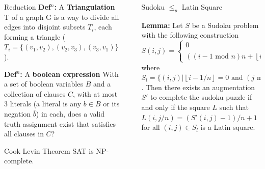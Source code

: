 \documentclass[final]{beamer}
\newlength{\sepwidth}
\newlength{\colwidth}
\newcounter{row}
\newcounter{col}
\newcommand{\separatorcolumn}{\begin{column}{\sepwidth}\end{column}}
\newcommand\setrow[9]{
  \setcounter{col}{1}
  \foreach \n in {#1, #2, #3, #4, #5, #6, #7, #8, #9} {
    \edef\x{\value{col} - 0.5}
    \edef\y{9.5 - \value{row}}
    \node[anchor=center] at (\x, \y) {\n};
    \stepcounter{col}
  }
  \stepcounter{row}
}
\begin{document}
\begin{frame}[t]
\begin{columns}[t]
\begin{column}{\colwidth}
\begin{block}{Reduction}
\textbf{Def$^n$:} A \textbf{Triangulation} T of a graph G is a way to divide all edges into disjoint subsets $T_i$, each forming a triangle ($T_i=\{(v_{1}, v_{2}),(v_{2}, v_{3}),(v_{3},v_{1})\}$).

\textbf{Def$^n$:} A \textbf{boolean expression}  With a set of boolean variables $B$ and a collection of clauses $C$, with at most 3 literals (a literal is any $b \in B$ or its negation $\bar{b}$) in each, does a valid truth assignment exist that satisfies all clauses in $C$?


  \end{block}
  \begin{alertblock}{Cook Levin Theorem}
SAT is NP-complete.
  \end{alertblock}
\end{column}

\separatorcolumn

\begin{column}{\colwidth}
  \begin{block}{Sudoku $\leq_p$ Latin Square}

\textbf{Lemma:} Let $S$ be a Sudoku problem with the following construction 
\begin{equation}
	S(i,j) =\begin{cases}
0 \qquad\qquad\qquad\qquad\qquad\qquad\text{when } (i,j) \in S_l \\ 
((i-1 \text{ mod } n)n + \left\lfloor{i-1/n}\right\rfloor+j-1)\text{ mod } n^2 +1 \quad\text{otherwise}
\end{cases}
\end{equation}
where $S_l=\{(i,j)| \left\lfloor{i-1/n}\right\rfloor=0 \text{ and }(j \text{ mod }n)=1\}$. Then there exists an augmentation $S'$ to complete the sudoku puzzle if and only if the square $L$ such that $L(i,j/n)=(S'(i,j)-1)/n+1$ for all $(i,j) \in S_l$ is a Latin square.

\end{block}
\end{column}
\end{columns}
\end{frame}
\end{document}
